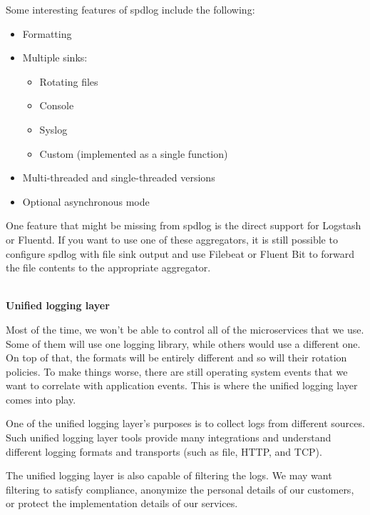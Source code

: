 Some interesting features of spdlog include the following:

\begin{itemize}
\item 
Formatting

\item 
Multiple sinks:
\begin{itemize}
\item 
Rotating files

\item 
Console

\item 
Syslog

\item 
Custom (implemented as a single function)
\end{itemize}

\item 
Multi-threaded and single-threaded versions

\item 
Optional asynchronous mode
\end{itemize}

One feature that might be missing from spdlog is the direct support for Logstash or Fluentd. If you want to use one of these aggregators, it is still possible to configure spdlog with file sink output and use Filebeat or Fluent Bit to forward the file contents to the appropriate aggregator.

\hspace*{\fill} \\ %
\noindent
\textbf{Unified logging layer}

Most of the time, we won't be able to control all of the microservices that we use. Some of them will use one logging library, while others would use a different one. On top of that, the formats will be entirely different and so will their rotation policies. To make things worse, there are still operating system events that we want to correlate with application events. This is where the unified logging layer comes into play.

One of the unified logging layer’s purposes is to collect logs from different sources. Such unified logging layer tools provide many integrations and understand different logging formats and transports (such as file, HTTP, and TCP).

The unified logging layer is also capable of filtering the logs. We may want filtering to satisfy compliance, anonymize the personal details of our customers, or protect the implementation details of our services.

